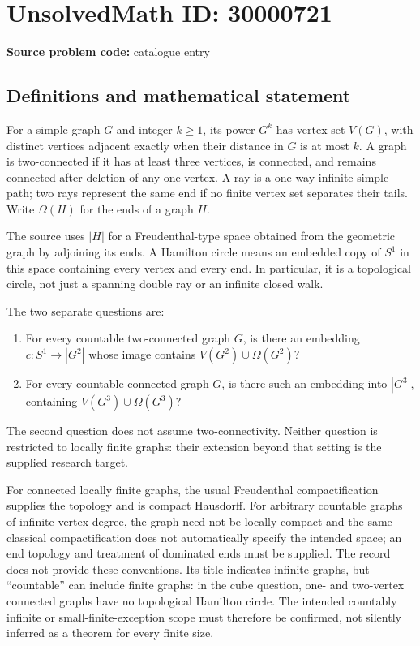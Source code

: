 \documentclass[11pt]{article}
\begin{document}
\section*{UnsolvedMath ID: 30000721}
\textbf{Source problem code:} catalogue entry
\subsection{Definitions and mathematical statement}
For a simple graph $G$ and integer $k\geq1$, its power $G^k$ has vertex set $V(G)$, with distinct vertices adjacent exactly when their distance in $G$ is at most $k$. A graph is two-connected if it has at least three vertices, is connected, and remains connected after deletion of any one vertex. A ray is a one-way infinite simple path; two rays represent the same end if no finite vertex set separates their tails. Write $\Omega(H)$ for the ends of a graph $H$.

The source uses $|H|$ for a Freudenthal-type space obtained from the geometric graph by adjoining its ends. A Hamilton circle means an embedded copy of $S^1$ in this space containing every vertex and every end. In particular, it is a topological circle, not just a spanning double ray or an infinite closed walk.

The two separate questions are:
\begin{enumerate}
\item For every countable two-connected graph $G$, is there an embedding $c:S^1\to|G^2|$ whose image contains $V(G^2)\cup\Omega(G^2)$?
\item For every countable connected graph $G$, is there such an embedding into $|G^3|$, containing $V(G^3)\cup\Omega(G^3)$?
\end{enumerate}
The second question does not assume two-connectivity. Neither question is restricted to locally finite graphs: their extension beyond that setting is the supplied research target.

For connected locally finite graphs, the usual Freudenthal compactification supplies the topology and is compact Hausdorff. For arbitrary countable graphs of infinite vertex degree, the graph need not be locally compact and the same classical compactification does not automatically specify the intended space; an end topology and treatment of dominated ends must be supplied. The record does not provide these conventions. Its title indicates infinite graphs, but ``countable'' can include finite graphs: in the cube question, one- and two-vertex connected graphs have no topological Hamilton circle. The intended countably infinite or small-finite-exception scope must therefore be confirmed, not silently inferred as a theorem for every finite size.
\end{document}
